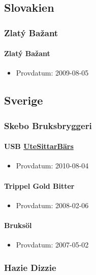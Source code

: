 \documentclass[11pt]{article}
\begin{document}
\subsection{Slovakien}
\label{sec:org9f78c5d}
\subsubsection{Zlatý Bažant}
\label{sec:org3a5aab7}
\paragraph{Zlatý Bažant}
\label{sec:orgab76df5}
\begin{itemize}
\item Provdatum: 2009-08-05
\end{itemize}
\subsection{Sverige}
\label{sec:org5703b79}
\subsubsection{Skebo Bruksbryggeri}
\label{sec:orgced08c0}
\paragraph{USB \underline{UteSittarBärs}}
\label{sec:org9fc2db0}
\begin{itemize}
\item Provdatum: 2010-08-04
\end{itemize}
\paragraph{Trippel Gold Bitter}
\label{sec:orgb2bfa0e}
\begin{itemize}
\item Provdatum: 2008-02-06
\end{itemize}
\paragraph{Bruksöl}
\label{sec:org73461d0}
\begin{itemize}
\item Provdatum: 2007-05-02
\end{itemize}
\subsubsection{Hazie Dizzie}
\label{sec:orgebeeb8b}
\end{document}

